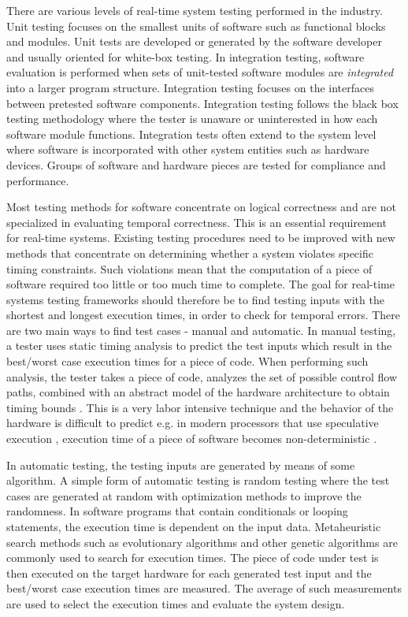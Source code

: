 There are various levels of real-time system testing performed in the industry. Unit testing focuses on the smallest units of software such as functional blocks and modules. Unit tests are developed or generated by the software developer and usually oriented for white-box testing. In integration testing, software evaluation is performed when sets of unit-tested software modules are \emph{integrated} into a larger program structure. Integration testing focuses on the interfaces between pretested software components. Integration testing follows the black box testing methodology where the tester is unaware or uninterested in how each software module functions. Integration tests often extend to the system level where software is incorporated with other system entities such as hardware devices. Groups of software and hardware pieces are tested for compliance and performance. 

Most testing methods for software concentrate on logical correctness and are not specialized in evaluating temporal correctness. This is an essential requirement for real-time systems. Existing testing procedures need to be improved with new methods that concentrate on determining whether a system violates specific timing constraints. Such violations mean that the computation of a piece of software required too little or too much time to complete. The goal for real-time systems testing frameworks should therefore be to find testing inputs with the shortest and longest execution times, in order to check for temporal errors. There are two main ways to find test cases - manual and automatic. In manual testing, a tester uses static timing analysis to predict the test inputs which result in the best/worst case execution times for a piece of code. When performing such analysis, the tester takes a piece of code, analyzes the set of possible control flow paths, combined with an abstract model of the hardware architecture to obtain timing bounds \cite{reviewWCET}. This is a very labor intensive technique and the behavior of the hardware is difficult to predict e.g. in modern processors that use speculative execution \cite{hennessy2011computer}, execution time of a piece of software becomes non-deterministic \cite{reineke2006definition}. 

In automatic testing, the testing inputs are generated by means of some algorithm. A simple form of automatic testing is random testing where the test cases are generated at random with optimization methods to improve the randomness. In software programs that contain conditionals or looping statements, the execution time is dependent on the input data. Metaheuristic search methods such as evolutionary algorithms \cite{wegener1998verifying} and other genetic algorithms \cite{wegener1997testing, puschner1998testing} are commonly used to search for execution times. The piece of code under test is then executed on the target hardware for each generated test input and the best/worst case execution times are measured. The average of such measurements are used to select the execution times and evaluate the system design.

